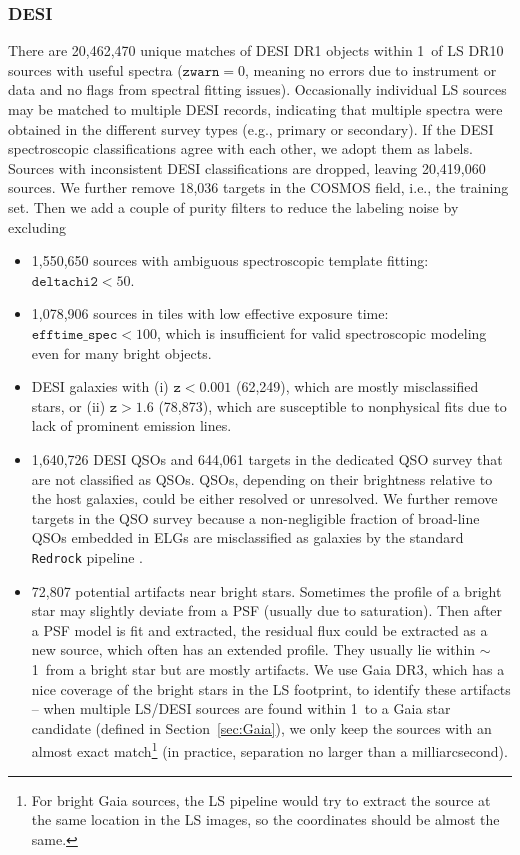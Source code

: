 \documentclass[twocolumn]{aastex631}
\newcommand{\dr}[1]{DR{#1}}
\begin{document}
\begin{CJK*}{UTF8}{gbsn}
\subsubsection{DESI}\label{sec:DESI}
There are 20,462,470 unique matches of DESI \dr{1} objects within 1\arcsec\ of LS \dr{10} sources with useful spectra ($\texttt{zwarn}=0$, meaning no errors due to instrument or data and no flags from spectral fitting issues). Occasionally individual LS sources may be matched to multiple DESI records, indicating that multiple spectra were obtained in the different survey types (e.g., primary or secondary). If the DESI spectroscopic classifications agree with each other, we adopt them as labels. Sources with inconsistent DESI classifications are dropped, leaving 20,419,060 sources. We further remove 18,036 targets in the COSMOS field, i.e., the training set. Then we add a couple of purity filters to reduce the labeling noise by excluding
\begin{itemize}
    \item 1,550,650 sources with ambiguous spectroscopic template fitting: $\texttt{deltachi2} < 50$.
    \item 1,078,906 sources in tiles with low effective exposure time: $\texttt{efftime\_spec} < 100$, which is insufficient for valid spectroscopic modeling even for many bright objects.
    \item DESI galaxies with (i) $\texttt{z}<0.001$ (62,249), which are mostly misclassified stars, or (ii) $\texttt{z}>1.6$ (78,873), which are susceptible to nonphysical fits due to lack of prominent emission lines.
    \item 1,640,726 DESI QSOs and 644,061 targets in the dedicated QSO survey that are not classified as QSOs. QSOs, depending on their brightness relative to the host galaxies, could be either resolved or unresolved. We further remove targets in the QSO survey because a non-negligible fraction of broad-line QSOs embedded in ELGs are misclassified as galaxies by the standard \texttt{Redrock} pipeline \citep{DESI_QSO_VI_2023}.
    \item 72,807 potential artifacts near bright stars. Sometimes the profile of a bright star may slightly deviate from a PSF (usually due to saturation). Then after a PSF model is fit and extracted, the residual flux could be extracted as a new source, which often has an extended profile. They usually lie within $\sim$1\arcsec\ from a bright star but are mostly artifacts. We use Gaia \dr{3}, which has a nice coverage of the bright stars in the LS footprint, to identify these artifacts -- when multiple LS/DESI sources are found within 1\arcsec\ to a Gaia star candidate (defined in Section~\ref{sec:Gaia}), we only keep the sources with an almost exact match\footnote{For bright Gaia sources, the LS pipeline would try to extract the source at the same location in the LS images, so the coordinates should be almost the same.} (in practice, separation no larger than a milliarcsecond).

\end{itemize}
\end{CJK*}
\end{document}

